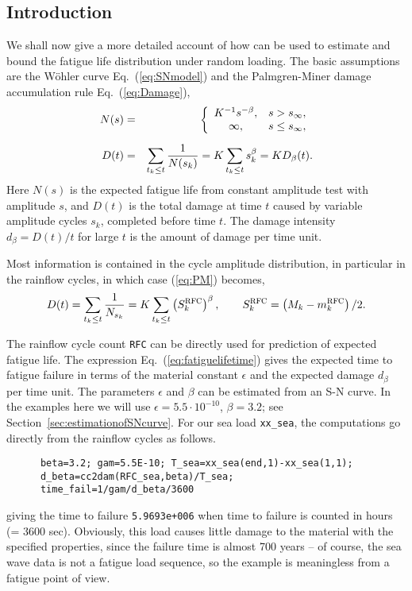 \subsection{Introduction}\label{sec:fatigueintroduction}
We shall now give a more detailed account of how
\progname{} can be used to estimate
and bound the fatigue life distribution under random loading.
The basic assumptions are the W{\" o}hler curve Eq.~(\ref{eq:SNmodel})
and the Palmgren-Miner damage accumulation rule Eq.~(\ref{eq:Damage}),
\begin{eqnarray} %
N(s)&=&\left\{ \begin{array}{c@{\quad}l}
K^{-1} s^{-\beta}, & s> s_{\infty},\\
\infty, & s\le s_{\infty},\end{array}\right.\label{eq:W} \\[0.6em]
  D(t)&=&\sum_{t_k\le t}\frac{1}{N(s_k)}=K\sum_{t_k\le
  t}s_k^\beta=K D_\beta(t). \label{eq:PM}
\end{eqnarray}
Here $N(s)$ is the expected fatigue life from constant amplitude test with
amplitude $s$, and $D(t)$ is the total damage at time $t$ caused by variable
amplitude cycles $s_k$, completed before time $t$.
The damage intensity $d_\beta = D(t)/t$ for large $t$ is the amount of
damage per time unit.

Most information is contained in the cycle amplitude distribution,
in particular in
the rainflow cycles, in which case (\ref{eq:PM}) becomes,
$$
  D(t) = \sum_{t_k\le t} \frac{1}{N_{s_k}}
  = K \sum_{t_k\le t} \left(S_k^{{\protect\mbox{\protect\small\protect\sc rfc}}}\right)^{\beta}, \qquad
  S_k^{{\protect\mbox{\protect\small\protect\sc rfc}}} = \left(M_k-m_k^{{\protect\mbox{\protect\small\protect\sc rfc}}}\right)/2.
$$

The rainflow cycle count {\tt RFC} can be directly used for prediction of
expected fatigue life. The expression Eq.~(\ref{eq:fatiguelifetime}) gives the
expected time to fatigue failure in terms of the material constant $\epsilon$
and the expected damage $d_\beta$ per time unit. The parameters $\epsilon$ and
$\beta$ can be estimated from an S-N curve. In the examples here we will use
$\epsilon=5.5\cdot10^{-10}$, $\beta=3.2$;
see Section~\ref{sec:estimationofSNcurve}.
For our sea load \verb+xx_sea+, the computations go directly from the
rainflow cycles as follows.
{\small\begin{verbatim}
      beta=3.2; gam=5.5E-10; T_sea=xx_sea(end,1)-xx_sea(1,1);
      d_beta=cc2dam(RFC_sea,beta)/T_sea;
      time_fail=1/gam/d_beta/3600
\end{verbatim}}
\noindent
giving the time to failure  {\tt 5.9693e+006} when time to
failure is counted in hours (= 3600 sec).
Obviously, this load causes little damage to the material with the
specified properties, since the failure time is almost 700 years --
of course, the sea wave data is not a fatigue load sequence, so the example is
meaningless from a fatigue point of view.

